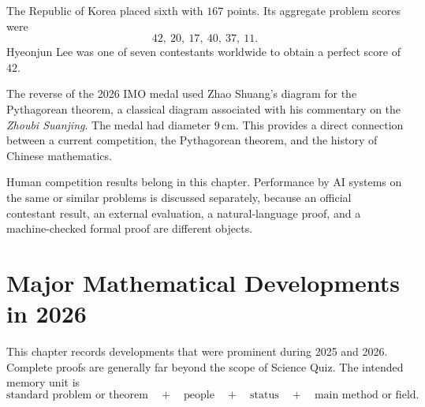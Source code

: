     \begin{fact}
        The Republic of Korea placed sixth with $167$ points. Its aggregate problem scores were
        \[
            42,\ 20,\ 17,\ 40,\ 37,\ 11.
        \]
        Hyeonjun Lee was one of seven contestants worldwide to obtain a perfect
        score of $42$.
    \end{fact}

    \begin{fact}
        The reverse of the 2026 IMO medal used Zhao Shuang's diagram for the
        Pythagorean theorem, a classical diagram associated with his commentary
        on the \textit{Zhoubi Suanjing}. The medal had diameter $9\,\mathrm{cm}$.
        This provides a direct connection between a current competition, the
        Pythagorean theorem, and the history of Chinese mathematics.
    \end{fact}

    \begin{remark}
        Human competition results belong in this chapter. Performance by AI
        systems on the same or similar problems is discussed separately, because
        an official contestant result, an external evaluation, a natural-language
        proof, and a machine-checked formal proof are different objects.
    \end{remark}

    \chapter{Major Mathematical Developments in 2026}

    This chapter records developments that were prominent during 2025 and 2026.
    Complete proofs are generally far beyond the scope of Science Quiz. The
    intended memory unit is
    \[
        \text{standard problem or theorem}
        \quad+\quad
        \text{people}
        \quad+\quad
        \text{status}
        \quad+\quad
        \text{main method or field}.
    \]

    \vspace{1em}

